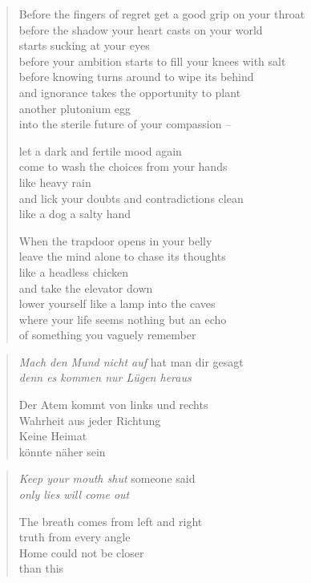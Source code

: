 \begin{verse}

Before the fingers of regret get a good grip on your throat\\
before the shadow your heart casts on your world\\
starts sucking at your eyes\\
before your ambition starts to fill your knees with salt\\
before knowing turns around to wipe its behind\\
and ignorance takes the opportunity to plant\\
another plutonium egg\\
into the sterile future of your compassion --

let a dark and fertile mood again\\
come to wash the choices from your hands\\
like heavy rain\\
and lick your doubts and contradictions clean\\
like a dog a salty hand

When the trapdoor opens in your belly\\
leave the mind alone to chase its thoughts\\
like a headless chicken\\
and take the elevator down\\
lower yourself like a lamp into the caves\\
where your life seems nothing but an echo\\
of something you vaguely remember

\end{verse}

\clearpage

\begin{verse}

\emph{Mach den Mund nicht auf} hat man dir gesagt\\
\emph{denn es kommen nur Lügen heraus}

Der Atem kommt von links und rechts\\
Wahrheit aus jeder Richtung\\
Keine Heimat\\
könnte näher sein

\end{verse}

\clearpage

\begin{verse}
\emph{Keep your mouth shut} someone said\\
\emph{only lies will come out}

The breath comes from left and right\\
truth from every angle\\
Home could not be closer\\
than this

\end{verse}

\restoregeometry

